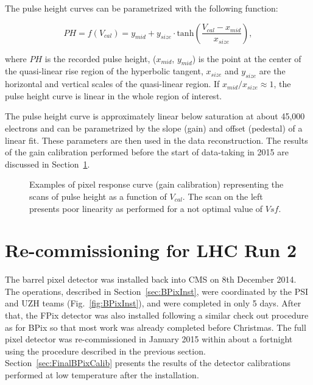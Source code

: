 The pulse height curves can be parametrized with the following function:

\begin{equation}
PH = f(V_{cal}) = y_{mid} + y_{size} \cdot \mathrm{tanh}\left( \frac{V_{cal} - x_{mid}}{x_{size}} \right),
\end{equation}

where $PH$ is the recorded pulse height,
($x_{mid}$, $y_{mid}$) is the point at the center of the quasi-linear rise region of the hyperbolic tangent,
$x_{size}$ and $y_{size}$ are the horizontal and vertical scales of the quasi-linear region.
If $x_{mid}/x_{size} \approx 1$, the pulse height curve is linear in the whole region of interest.

The pulse height curve is approximately linear below saturation at about 45,000 electrons and can be parametrized by the slope (gain) and offset (pedestal) of a linear fit.
These parameters are then used in the data reconstruction. 
The results of the gain calibration performed before the start of data-taking in 2015 are discussed in Section~\ref{sec:commissioning}.

\begin{figure}[!htb]
 \begin{center}
 \end{center}
 \caption{Examples of pixel response curve (gain calibration) representing the scans of pulse height as a function of $V_{cal}$. The scan on the left presents poor linearity as performed for a not optimal value of $Vsf$.}
 \label{fig:GainCalib}
\end{figure}

\section{Re-commissioning for LHC Run 2}\label{sec:commissioning}

The barrel pixel detector was installed back into CMS on 8th December 2014.
The operations, described in Section~\ref{sec:BPixInst}, were coordinated by the PSI and UZH teams (Fig.~\ref{fig:BPixInst}), and were completed in only 5 days.
After that, the FPix detector was also installed following a similar check out procedure as for BPix so that most work was already completed before Christmas.
The full pixel detector was re-commissioned in January 2015 within about a fortnight using the procedure described in the previous section.
Section~\ref{sec:FinalBPixCalib} presents the results of the detector calibrations performed at low temperature after the installation.

